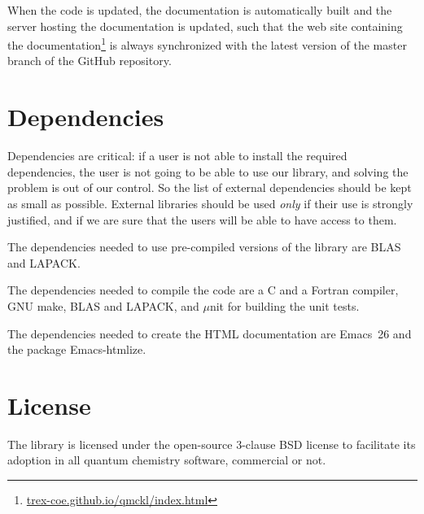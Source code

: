 When the code is updated, the documentation is automatically built and
the server hosting the documentation is updated, such that the web
site containing the
documentation\footnote{\url{trex-coe.github.io/qmckl/index.html}}
is always synchronized with the latest version of the master branch of
the GitHub repository.

\section{Dependencies}

Dependencies are critical: if a user is not able to install the
required dependencies, the user is not going to be able to use our
library, and solving the problem is out of our control. So the list of
external dependencies should be kept as small as possible. 
External libraries should be used \emph{only} if their use is
strongly justified, and if we are sure that the users will be able to
have access to them.

The dependencies needed to use pre-compiled versions of the library
are \ac{BLAS} and \ac{LAPACK}.

The dependencies needed to compile the code are
a C and a Fortran compiler, GNU make, \ac{BLAS} and \ac{LAPACK}, and
$\mu$nit\cite{munit} for building the unit tests.

The dependencies needed to create the \ac{HTML} documentation are
Emacs~26 and the package Emacs-htmlize.

\section{License}

The library is licensed under the open-source 3-clause BSD license to facilitate
its adoption in all quantum chemistry software, commercial or not.
